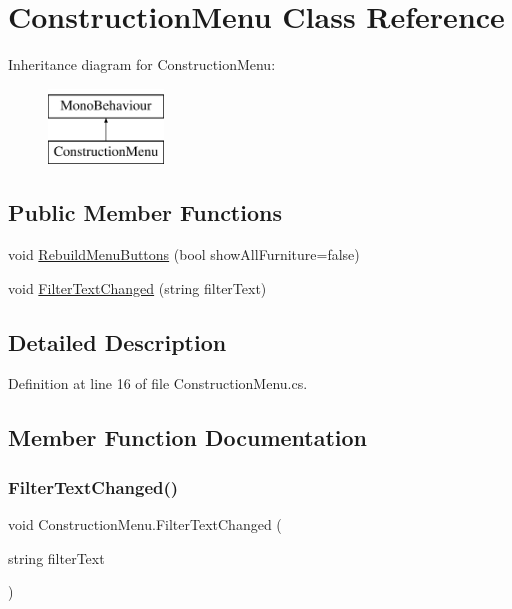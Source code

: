 \hypertarget{class_construction_menu}{}\section{Construction\+Menu Class Reference}
\label{class_construction_menu}
Inheritance diagram for Construction\+Menu\+:\begin{figure}[H]
\begin{center}
\leavevmode
\includegraphics[height=2.000000cm]{class_construction_menu}
\end{center}
\end{figure}
\subsection*{Public Member Functions}
\begin{DoxyCompactItemize}
\item 
void \hyperlink{class_construction_menu_aad168bb3fd4e26cb7a814352cae8bbeb}{Rebuild\+Menu\+Buttons} (bool show\+All\+Furniture=false)
\item 
void \hyperlink{class_construction_menu_a036f270a339fdc25e672ead9a4fe6282}{Filter\+Text\+Changed} (string filter\+Text)
\end{DoxyCompactItemize}


\subsection{Detailed Description}


Definition at line 16 of file Construction\+Menu.\+cs.



\subsection{Member Function Documentation}
\mbox{\label{class_construction_menu_a036f270a339fdc25e672ead9a4fe6282}} 
\subsubsection{\texorpdfstring{Filter\+Text\+Changed()}{FilterTextChanged()}}
{\footnotesize\ttfamily void Construction\+Menu.\+Filter\+Text\+Changed (\begin{DoxyParamCaption}\item[{string}]{filter\+Text }\end{DoxyParamCaption})}



